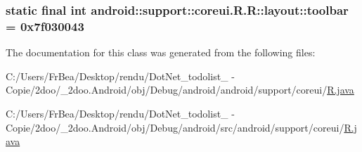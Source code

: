 \hypertarget{classandroid_1_1support_1_1coreui_1_1_r_1_1layout_b1fe144172c1ed45d5c04c72b2ec26a2}{
\subsubsection[{toolbar}]{\setlength{\rightskip}{0pt plus 5cm}static final int android::support::coreui.R.R::layout::toolbar = 0x7f030043}}
\label{classandroid_1_1support_1_1coreui_1_1_r_1_1layout_b1fe144172c1ed45d5c04c72b2ec26a2}




The documentation for this class was generated from the following files:\begin{CompactItemize}
\item 
C:/Users/FrBea/Desktop/rendu/DotNet\_\-todolist\_ - Copie/2doo/\_\-2doo.Android/obj/Debug/android/android/support/coreui/\hyperlink{android_2support_2coreui_2_r_8java}{R.java}\item 
C:/Users/FrBea/Desktop/rendu/DotNet\_\-todolist\_ - Copie/2doo/\_\-2doo.Android/obj/Debug/android/src/android/support/coreui/\hyperlink{src_2android_2support_2coreui_2_r_8java}{R.java}\end{CompactItemize}
